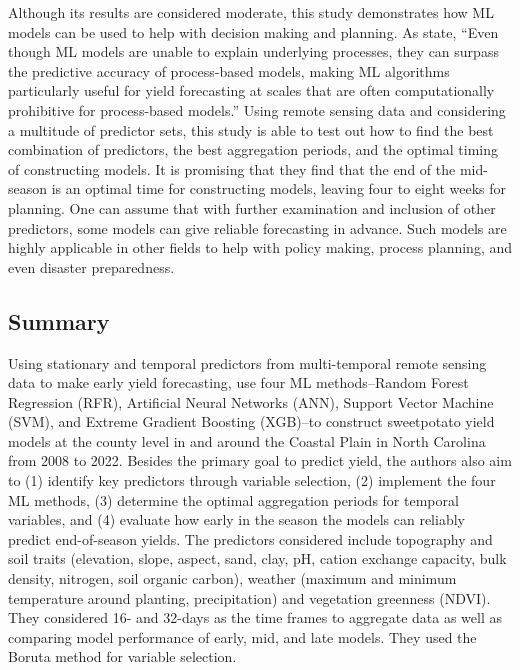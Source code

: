 \documentclass[
]{book}
\begin{document}
Although its results are considered moderate, this study demonstrates how ML models can be used to help with decision making and planning. As \citet{carbajal-carrasco2024} state, ``Even though ML models are unable to explain underlying processes, they can surpass the predictive accuracy of process-based models, making ML algorithms particularly useful for yield forecasting at scales that are often computationally prohibitive for process-based models.'' Using remote sensing data and considering a multitude of predictor sets, this study is able to test out how to find the best combination of predictors, the best aggregation periods, and the optimal timing of constructing models. It is promising that they find that the end of the mid-season is an optimal time for constructing models, leaving four to eight weeks for planning. One can assume that with further examination and inclusion of other predictors, some models can give reliable forecasting in advance. Such models are highly applicable in other fields to help with policy making, process planning, and even disaster preparedness.

\hypertarget{summary-2}{%
\subsection{Summary}\label{summary-2}}

Using stationary and temporal predictors from multi-temporal remote sensing data to make early yield forecasting, \citet{carbajal-carrasco2024} use four ML methods--Random Forest Regression (RFR), Artificial Neural Networks (ANN), Support Vector Machine (SVM), and Extreme Gradient Boosting (XGB)--to construct sweetpotato yield models at the county level in and around the Coastal Plain in North Carolina from 2008 to 2022. Besides the primary goal to predict yield, the authors also aim to (1) identify key predictors through variable selection, (2) implement the four ML methods, (3) determine the optimal aggregation periods for temporal variables, and (4) evaluate how early in the season the models can reliably predict end-of-season yields. The predictors considered include topography and soil traits (elevation, slope, aspect, sand, clay, pH, cation exchange capacity, bulk density, nitrogen, soil organic carbon), weather (maximum and minimum temperature around planting, precipitation) and vegetation greenness (NDVI). They considered 16- and 32-days as the time frames to aggregate data as well as comparing model performance of early, mid, and late models. They used the Boruta method for variable selection.
\end{document}
